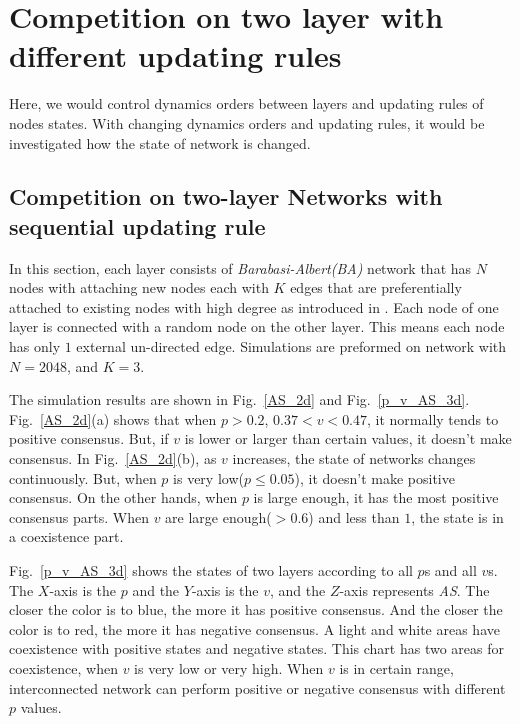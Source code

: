 
\chapter{Competition on two layer with different updating rules}
\label{chap:competition on two layer with different updating rules}
Here, we would control dynamics orders between layers and updating rules of nodes states. With changing dynamics orders and updating rules, it would be investigated how the state of network is changed.

\section{Competition on two-layer Networks with sequential updating rule}
In this section, each layer consists of \textit{Barabasi-Albert(BA)} network that has $N$ nodes with attaching new nodes each with $K$ edges that are preferentially attached to existing nodes with high degree as introduced in \cite{barabasi1999}. Each node of one layer is connected with a random node on the other layer. This means each node has only $1$ external un-directed edge. Simulations are preformed on network with $N=2048$, and $K = 3$.

The simulation results are shown in Fig.~\ref{AS_2d} and Fig.~\ref{p_v_AS_3d}. Fig.~\ref{AS_2d}(a) shows that when $p > 0.2$, $0.37 < v < 0.47$, it normally tends to positive consensus. But, if $v$ is lower or larger than certain values, it doesn't make consensus.
In Fig.~\ref{AS_2d}(b), as $v$ increases, the state of networks changes continuously. But, when $p$ is very low($p \le 0.05$), it doesn't make positive consensus. On the other hands, when $p$ is large enough, it has the most positive consensus parts. When $v$ are large enough($>0.6$) and less than $1$, the state is in a coexistence part.


Fig.~\ref{p_v_AS_3d} shows the states of two layers according to all $p$s and all $v$s. The $X$-axis is the $p$ and the $Y$-axis is the $v$, and the $Z$-axis represents \textit{AS}. The closer the color is to blue, the more it has positive consensus. And the closer the color is to red, the more it has negative consensus. A light and white areas have coexistence with positive states and negative states. This chart has two areas for coexistence, when $v$ is very low or very high. When $v$ is in certain range, interconnected network can perform positive or negative consensus with different $p$ values. 

